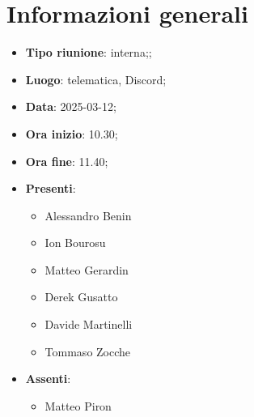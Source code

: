 \section{Informazioni generali}
\begin{itemize}
  \item \textbf{Tipo riunione}: interna;;
  \item \textbf{Luogo}: telematica, Discord;
  \item \textbf{Data}: 2025-03-12;
  \item \textbf{Ora inizio}: 10.30;
  \item \textbf{Ora fine}: 11.40;
  
  \item \textbf{Presenti}:
  \begin{itemize}
    \item Alessandro Benin
    \item Ion Bourosu
    \item Matteo Gerardin
    \item Derek Gusatto
    \item Davide Martinelli

    \item Tommaso Zocche
  \end{itemize}

  \item \textbf{Assenti}:
    \begin{itemize}
    \item Matteo Piron
  \end{itemize}
 
\end{itemize}